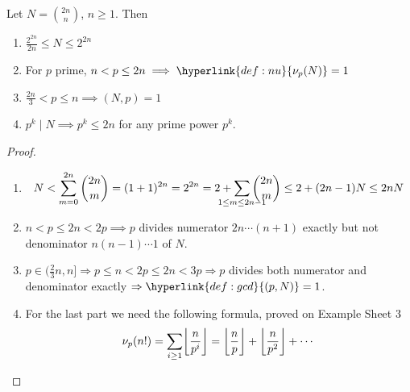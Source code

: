 \documentclass{article}
\DeclarePairedDelimiter\floor{\lfloor}{\rfloor}
\begin{document}
\begin{nlemma}\label{lem:5.7}
    Let $N = \binom{2n}{n}$, $n \geq 1$. Then
    \begin{enumerate}[label=(\roman*)]
        \item $\frac{2^{2n}}{2n} \leq N \leq 2^{2n}$
        \item For $p$ prime, $n < p \leq 2n \implies \hyperlink{def:nu}{\nu_p(N)} = 1$
        \item $\frac{2n}{3} < p \leq n \implies (N, p) = 1$
        \item $p^k \mid N \implies p^k \leq 2n$ for any prime power $p^k$.
    \end{enumerate}
\end{nlemma}

\begin{proof}
    \leavevmode
    \begin{enumerate}[label=(\roman*)]
        \item
            \begin{equation*}
                N < \sum_{m=0}^{2n} \binom{2n}{m} = (1+1)^{2n} = 2^{2n} = 2 + \sum_{\mathclap{1 \leq m \leq 2n-1}} \binom{2n}{m} \leq 2 + (2n-1) N \leq 2n N
            \end{equation*}
        \item $n < p \leq 2n < 2p \implies p$ divides numerator $2n \dotsm (n+1)$ exactly but not denominator $n (n-1) \dotsm 1$ of $N$.
        \item $p \in (\frac{2}{3}n, n] \Rightarrow p \leq n < 2p \leq 2n < 3p \Rightarrow p$ divides both numerator and denominator exactly $\Rightarrow \hyperlink{def:gcd}{(p, N)} = 1$.
        \item For the last part we need the following formula, proved on Example Sheet 3
            \begin{equation*}
                \nu_p(n!) = \sum_{i \geq 1} \floor*{\frac{n}{p^i}} = \floor*{\frac{n}{p}} + \floor*{\frac{n}{p^2}} + \dotsb
            \end{equation*}


\end{enumerate}
\end{proof}
\end{document}
